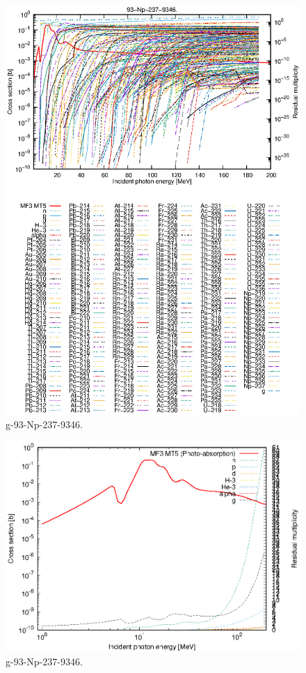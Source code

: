 \begin{figure}
 \includegraphics[width=\linewidth]{eps/g_93-Np-237_9346.eps}
  \caption{g-93-Np-237-9346.}
\end{figure}
\newpage \clearpage

\begin{figure}
 \includegraphics[width=\linewidth]{eps-log/g_93-Np-237_9346.eps}
 \caption{g-93-Np-237-9346.}
\end{figure}
\newpage \clearpage

